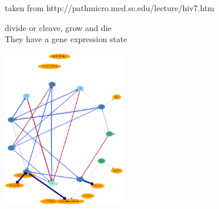 \documentclass[compress]{beamer}
\begin{document}
\begin{frame}
\begin{columns}
\begin{column}{0.49\textwidth}
\begin{center}
  \tiny taken from http://pathmicro.med.sc.edu/lecture/hiv7.htm \\
  \vspace*{-0.2cm}
     \end{center}
     \small divide or cleave, grow and die\\
      \small They have a gene expression state\\
      \vspace*{-0.35cm}
     \begin{center}
  \includegraphics[width=0.4\textwidth]{figures/grn.pdf}\\
     \end{center}
     
    \end{column}
   \end{columns}


\end{frame}
 
\end{document}

